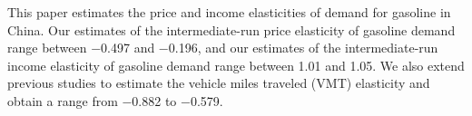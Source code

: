 This paper estimates the price and income elasticities of demand for gasoline in China. Our estimates of the intermediate-run price elasticity of gasoline demand range between −0.497 and −0.196, and our estimates of the intermediate-run income elasticity of gasoline demand range between 1.01 and 1.05. We also extend previous studies to estimate the vehicle miles traveled (VMT) elasticity and obtain a range from −0.882 to −0.579.
